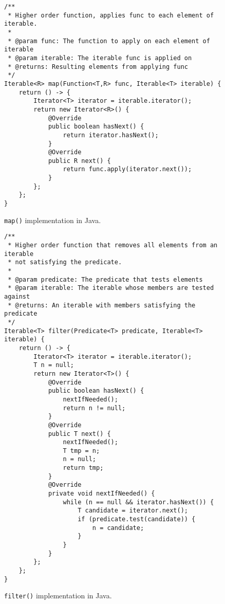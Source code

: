 \documentclass[abstracton,12pt]{scrartcl}
\theoremstyle{definition}
\begin{document}
\begin{figure}[h]
  \begin{framed}
\begin{verbatim}
/**
 * Higher order function, applies func to each element of iterable.
 *
 * @param func: The function to apply on each element of iterable
 * @param iterable: The iterable func is applied on
 * @returns: Resulting elements from applying func
 */
Iterable<R> map(Function<T,R> func, Iterable<T> iterable) {
    return () -> {
        Iterator<T> iterator = iterable.iterator();
        return new Iterator<R>() {
            @Override
            public boolean hasNext() {
                return iterator.hasNext();
            }
            @Override
            public R next() {
                return func.apply(iterator.next());
            }
        };
    };
}
\end{verbatim}
  \end{framed}
  \caption{\texttt{map()} implementation in Java.}
  \label{fig:java_map}
\end{figure}

\begin{figure}[h]
  \begin{framed}
\begin{verbatim}
/**
 * Higher order function that removes all elements from an iterable
 * not satisfying the predicate.
 *
 * @param predicate: The predicate that tests elements
 * @param iterable: The iterable whose members are tested against
 * @returns: An iterable with members satisfying the predicate
 */
Iterable<T> filter(Predicate<T> predicate, Iterable<T> iterable) {
    return () -> {
        Iterator<T> iterator = iterable.iterator();
        T n = null;
        return new Iterator<T>() {
            @Override
            public boolean hasNext() {
                nextIfNeeded();
                return n != null; 
            }
            @Override
            public T next() {
                nextIfNeeded();
                T tmp = n;
                n = null;
                return tmp;
            }
            @Override
            private void nextIfNeeded() {
                while (n == null && iterator.hasNext()) {
                    T candidate = iterator.next();
                    if (predicate.test(candidate)) {
                        n = candidate;
                    }
                }
            }
        };
    };
}
\end{verbatim}
  \end{framed}
  \caption{\texttt{filter()} implementation in Java.}
  \label{fig:java_filter}
\end{figure}
\end{document}
